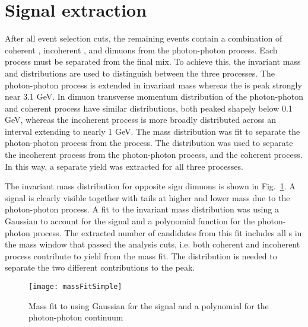   \section{\label{sec:sigEx} Signal extraction}
    After all event selection cuts, the remaining events contain a combination 
      of coherent \JPsi{}, incoherent \JPsi{}, and dimuons from the 
      photon-photon process.
    Each process must be separated from the final mix.
    To achieve this, the invariant mass and \pt{} distributions are used 
      to distinguish between the three processes. 
    The photon-photon process is extended in invariant mass whereas the 
      \JPsi{} is peak strongly near 3.1 GeV.
    In dimuon transverse momentum distribution of the photon-photon and 
      coherent process have similar distributions, both peaked shapely below 
        0.1 GeV, whereas the incoherent process is more broadly distributed 
        across an interval extending to nearly 1 GeV.
    The mass distribution was fit to separate the photon-photon process from
      the \JPsi{} process.
    The \pt{} distribution was used to separate the incoherent process from 
      the photon-photon process, and the coherent process. 
    In this way, a separate yield was extracted for all three processes. 

    The invariant mass distribution for opposite sign dimuons is shown in 
      Fig.~\ref{fig:massFit}. 
    A \JPsi{} signal is clearly visible together with tails at higher and
      lower mass due to the photon-photon process.
    A fit to the invariant mass distribution was \DIFdelbegin {}\DIFdelend \DIFaddbegin {}\DIFaddend using a Gaussian
      to account for the \JPsi{} signal and a \DIFdelbegin {}\DIFdelend \DIFaddbegin {}\DIFaddend polynomial function 
      for the photon-photon process.
    The extracted number of \JPsi{} candidates from this fit includes all 
      \JPsi{}s in the mass window that passed the analysis cuts, i.e. both
      coherent and incoherent process contribute to yield from the mass
      fit.
    The \pt{} distribution is needed to separate the two different 
      contributions to the \JPsi{} peak. 

    \begin{figure}[!Hhtb]
      \centering
      \texttt{[image: massFitSimple]}
      \caption{Mass fit to \JPsi{} using Gaussian for the 
        signal and a \DIFdelbeginFL {}\DIFdelendFL \DIFaddbeginFL {}\DIFaddendFL polynomial for the photon-photon continuum\DIFaddbeginFL {}\DIFaddendFL }
      \label{fig:massFit}
    \end{figure}

